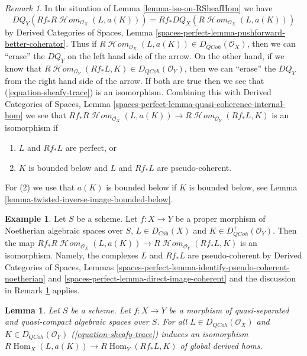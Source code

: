 \documentclass{stacks-project}
\theoremstyle{plain}
\newtheorem{lemma}[subsection]{Lemma}
\theoremstyle{definition}
\newtheorem{example}[subsection]{Example}
\theoremstyle{remark}
\newtheorem{remark}[subsection]{Remark}
\numberwithin{equation}{subsection}
\def\Hom{\mathop{\mathrm{Hom}}\nolimits}
\def\SheafHom{\mathop{\mathcal{H}\!\mathit{om}}\nolimits}
\def\QCoh{\mathit{QCoh}}
\begin{document}
\begin{remark}
\label{remark-iso-on-RSheafHom}
In the situation of Lemma \ref{lemma-iso-on-RSheafHom} we have
$$
DQ_Y(Rf_*R\SheafHom_{\mathcal{O}_X}(L, a(K))) =
Rf_* DQ_X(R\SheafHom_{\mathcal{O}_X}(L, a(K)))
$$
by Derived Categories of Spaces, Lemma
\ref{spaces-perfect-lemma-pushforward-better-coherator}.
Thus if $R\SheafHom_{\mathcal{O}_X}(L, a(K)) \in D_\QCoh(\mathcal{O}_X)$,
then we can ``erase'' the $DQ_Y$ on the left hand side of the arrow.
On the other hand, if we know that
$R\SheafHom_{\mathcal{O}_Y}(Rf_*L, K) \in D_\QCoh(\mathcal{O}_Y)$,
then we can ``erase'' the $DQ_Y$ from the right hand side of the arrow.
If both are true then we see that (\ref{equation-sheafy-trace})
is an isomorphism. Combining this with
Derived Categories of Spaces, Lemma
\ref{spaces-perfect-lemma-quasi-coherence-internal-hom}
we see that $Rf_*R\SheafHom_{\mathcal{O}_X}(L, a(K)) \to
R\SheafHom_{\mathcal{O}_Y}(Rf_*L, K)$ is an isomorphism if
\begin{enumerate}
\item $L$ and $Rf_*L$ are perfect, or
\item $K$ is bounded below and $L$ and $Rf_*L$ are pseudo-coherent.
\end{enumerate}
For (2) we use that $a(K)$ is bounded below if $K$
is bounded below, see Lemma \ref{lemma-twisted-inverse-image-bounded-below}.
\end{remark}

\begin{example}
\label{example-iso-on-RSheafHom-noetherian}
Let $S$ be a scheme.
Let $f : X \to Y$ be a proper morphism of Noetherian algebraic spaces
over $S$, $L \in D^-_{\textit{Coh}}(X)$ and $K \in D^+_{\QCoh}(\mathcal{O}_Y)$.
Then the map $Rf_*R\SheafHom_{\mathcal{O}_X}(L, a(K)) \to
R\SheafHom_{\mathcal{O}_Y}(Rf_*L, K)$ is an isomorphism.
Namely, the complexes $L$ and $Rf_*L$ are pseudo-coherent by
Derived Categories of Spaces, Lemmas
\ref{spaces-perfect-lemma-identify-pseudo-coherent-noetherian} and
\ref{spaces-perfect-lemma-direct-image-coherent}
and the discussion in Remark \ref{remark-iso-on-RSheafHom} applies.
\end{example}

\begin{lemma}
\label{lemma-iso-global-hom}
Let $S$ be a scheme.
Let $f : X \to Y$ be a morphism of quasi-separated and quasi-compact
algebraic spaces over $S$.
For all $L \in D_\QCoh(\mathcal{O}_X)$ and $K \in D_\QCoh(\mathcal{O}_Y)$
(\ref{equation-sheafy-trace}) induces an isomorphism
$R\Hom_X(L, a(K)) \to R\Hom_Y(Rf_*L, K)$ of global derived homs.
\end{lemma}
\end{document}
